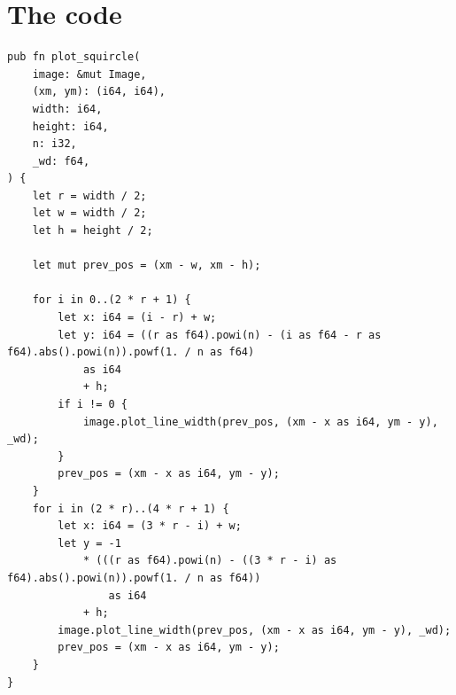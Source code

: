 \documentclass[12pt,openany,a4,usenames,dvipsnames]{book}
\begin{document}
\section*{The code}
\begin{verbatim}
pub fn plot_squircle(
    image: &mut Image,
    (xm, ym): (i64, i64),
    width: i64,
    height: i64,
    n: i32,
    _wd: f64,
) {
    let r = width / 2;
    let w = width / 2;
    let h = height / 2;

    let mut prev_pos = (xm - w, xm - h);

    for i in 0..(2 * r + 1) {
        let x: i64 = (i - r) + w;
        let y: i64 = ((r as f64).powi(n) - (i as f64 - r as f64).abs().powi(n)).powf(1. / n as f64)
            as i64
            + h;
        if i != 0 {
            image.plot_line_width(prev_pos, (xm - x as i64, ym - y), _wd);
        }
        prev_pos = (xm - x as i64, ym - y);
    }
    for i in (2 * r)..(4 * r + 1) {
        let x: i64 = (3 * r - i) + w;
        let y = -1
            * (((r as f64).powi(n) - ((3 * r - i) as f64).abs().powi(n)).powf(1. / n as f64))
                as i64
            + h;
        image.plot_line_width(prev_pos, (xm - x as i64, ym - y), _wd);
        prev_pos = (xm - x as i64, ym - y);
    }
}
\end{verbatim}
\end{document}
